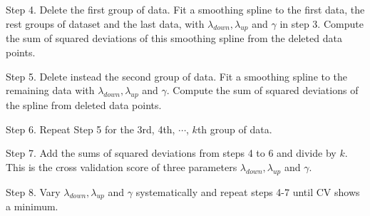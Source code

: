 Step 4. Delete the first group of data. Fit a smoothing spline to the first data, the rest groups of dataset and the last data, with  $\lambda_{down}, \lambda_{up}$ and $\gamma$ in step 3. Compute the sum of squared deviations of this smoothing spline from the deleted data points.

Step 5. Delete instead the second group of data. Fit a smoothing spline to the remaining data with  $\lambda_{down}, \lambda_{up}$ and $\gamma$. Compute the sum of squared deviations of the spline from deleted data points.

Step 6. Repeat Step 5 for the 3rd, 4th, $\cdots$, $k$th group of data.

Step 7. Add the sums of squared deviations from steps 4 to 6 and divide by $k$. This is the cross validation score of three parameters  $\lambda_{down}, \lambda_{up}$ and $\gamma$.

Step 8. Vary  $\lambda_{down}, \lambda_{up}$ and $\gamma$ systematically and repeat steps 4-7 until CV shows a minimum.
